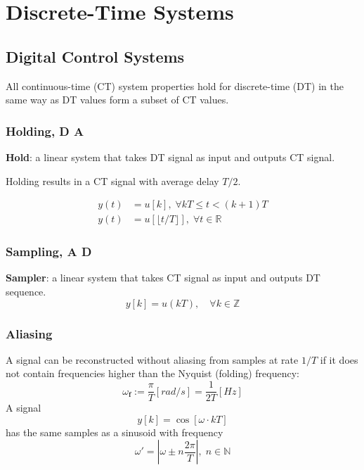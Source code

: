 \section{Discrete-Time Systems}
\subsection{Digital Control Systems}
All continuous-time (CT) system properties hold for discrete-time (DT) in the same way as DT values form a subset of CT values.
\subsubsection{Holding, D \textrightarrow{} A}
\textbf{Hold}: a linear system that takes DT signal as input and outputs CT signal.

Holding results in a CT signal with average delay $T/2$.
\newpar{}

\begin{align*}
    y(t) & =u[k], \; \forall kT \le t < (k+1)T                 \\
    y(t) & =u[\lfloor t/T\rfloor], \; \forall t \in \mathbb{R}
\end{align*}

\subsubsection{Sampling, A \textrightarrow{} D}
\textbf{Sampler}: a linear system that takes CT signal as input and outputs DT sequence.
\begin{equation*}
    y[k]=u(kT),\quad\forall k\in\mathbb{Z}
\end{equation*}

\subsubsection{Aliasing}

A signal can be reconstructed without aliasing from samples at rate $1/T$ if it does not contain frequencies higher than the Nyquist (folding) frequency:
\begin{equation*}
    \omega_{\mathbf{f}}:=\frac\pi T[rad/s]=\frac1{2T}[Hz]
\end{equation*}
A signal
\begin{equation*}
    y[k]=\cos[\omega\cdot kT]
\end{equation*}
has the same samples as a sinusoid with frequency
\begin{equation*}
    \omega'=\left|\omega\pm n\frac{2\pi}{T}\right|,\; n\in\mathbb{N}
\end{equation*}

